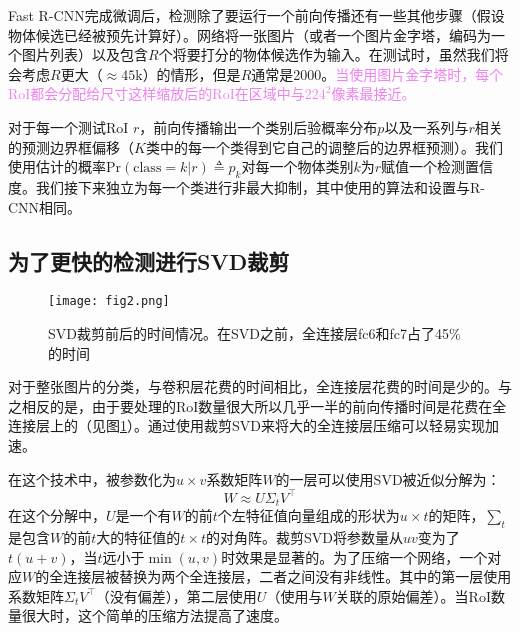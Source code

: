 \documentclass[../main]{subfile}
\begin{document}
Fast R-CNN完成微调后，检测除了要运行一个前向传播还有一些其他步骤（假设物体候选已经被预先计算好）。网络将一张图片（或者一个图片金字塔，编码为一个图片列表）以及包含$R$个将要打分的物体候选作为输入。在测试时，虽然我们将会考虑$R$更大（$\approx 45\text{k}$）的情形，但是$R$通常是2000。\textcolor{violet}{当使用图片金字塔时，每个RoI都会分配给尺寸这样缩放后的RoI在区域中与$224^2$像素最接近。}

对于每一个测试RoI $r$，前向传播输出一个类别后验概率分布$p$以及一系列与$r$相关的预测边界框偏移（$K$类中的每一个类得到它自己的调整后的边界框预测）。我们使用估计的概率$\text{Pr}(\text{class}=k|r)\triangleq p_k$对每一个物体类别$k$为$r$赋值一个检测置信度。我们接下来独立为每一个类进行非最大抑制，其中使用的算法和设置与R-CNN\cite{rcnn}相同。

\subsection{为了更快的检测进行SVD裁剪}

\begin{figure}[hb]
    \centering
    \texttt{[image: fig2.png]}
    \caption{SVD裁剪前后的时间情况。在SVD之前，全连接层fc6和fc7占了45\%的时间}
    \label{fig:img2}
\end{figure}

对于整张图片的分类，与卷积层花费的时间相比，全连接层花费的时间是少的。与之相反的是，由于要处理的RoI数量很大所以几乎一半的前向传播时间是花费在全连接层上的（见图\ref{fig:img2}）。通过使用裁剪SVD来将大的全连接层压缩可以轻易实现加速。

在这个技术中，被参数化为$u \times v$系数矩阵$W$的一层可以使用SVD被近似分解为：
\begin{equation}
    W \approx U \Sigma_tV^\top
\end{equation}
在这个分解中，$U$是一个有$W$的前$t$个左特征值向量组成的形状为$u \times t$的矩阵，$\sum_t$是包含$W$的前$t$大的特征值的$t\times t$的对角阵。裁剪SVD将参数量从$uv$变为了$t(u+v)$，当$t$远小于$\min(u, v)$时效果是显著的。为了压缩一个网络，一个对应$W$的全连接层被替换为两个全连接层，二者之间没有非线性。其中的第一层使用系数矩阵$\Sigma_t V^\top$（没有偏差），第二层使用$U$（使用与$W$关联的原始偏差）。当RoI数量很大时，这个简单的压缩方法提高了速度。
\end{document}
